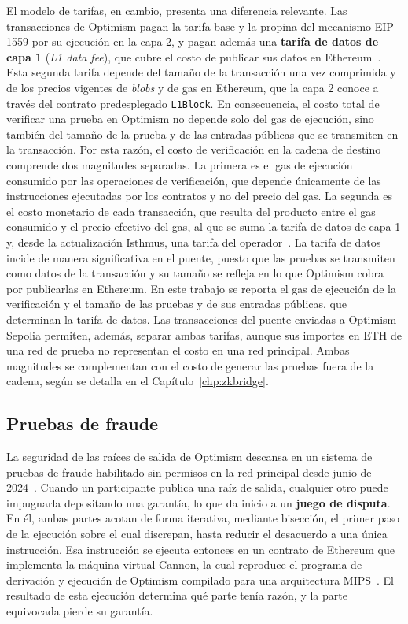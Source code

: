 El modelo de tarifas, en cambio, presenta una diferencia relevante. Las transacciones de Optimism
pagan la tarifa base y la propina del mecanismo EIP-1559 por su ejecución en la capa 2, y pagan
además una \textbf{tarifa de datos de capa 1} (\textit{L1 data fee}), que cubre el costo de
publicar sus datos en Ethereum~\cite{opspecsexec}. Esta segunda tarifa depende del tamaño de la
transacción una vez comprimida y de los precios vigentes de \textit{blobs} y de gas en Ethereum,
que la capa 2 conoce a través del contrato predesplegado \texttt{L1Block}. En consecuencia, el
costo total de verificar una prueba en Optimism no depende solo del gas de ejecución, sino
también del tamaño de la prueba y de las entradas públicas que se transmiten en la transacción.
Por esta razón, el costo de verificación en la cadena de destino comprende dos magnitudes
separadas. La primera es el gas de ejecución consumido por las operaciones de verificación, que
depende únicamente de las instrucciones ejecutadas por los contratos y no del precio del gas. La
segunda es el costo monetario de cada transacción, que resulta del producto entre el gas consumido
y el precio efectivo del gas, al que se suma la tarifa de datos de capa 1 y, desde la actualización
Isthmus, una tarifa del operador~\cite{opfees}. La tarifa de datos incide de manera significativa
en el puente, puesto que las pruebas se transmiten como datos de la transacción y su tamaño se
refleja en lo que Optimism cobra por publicarlas en Ethereum. En este trabajo se reporta el gas de
ejecución de la verificación y el tamaño de las pruebas y de sus entradas públicas, que determinan
la tarifa de datos. Las transacciones del puente enviadas a Optimism Sepolia permiten, además,
separar ambas tarifas, aunque sus importes en ETH de una red de prueba no representan el costo
en una red principal. Ambas magnitudes se complementan con el costo de generar las pruebas fuera de la
cadena, según se detalla en el Capítulo~\ref{chp:zkbridge}.

\subsection{Pruebas de fraude}
\label{sec:op_fraude}

La seguridad de las raíces de salida de Optimism descansa en un sistema de pruebas de fraude
habilitado sin permisos en la red principal desde junio de 2024~\cite{optimismfaultproofs}.
Cuando un participante publica una raíz de salida, cualquier otro puede impugnarla depositando
una garantía, lo que da inicio a un \textbf{juego de disputa}. En él, ambas partes acotan de
forma iterativa, mediante bisección, el primer paso de la ejecución sobre el cual discrepan, hasta
reducir el desacuerdo a una única instrucción. Esa instrucción se ejecuta entonces en un contrato
de Ethereum que implementa la máquina virtual Cannon, la cual reproduce el programa de derivación
y ejecución de Optimism compilado para una arquitectura MIPS~\cite{opcannon}. El resultado de esta
ejecución determina qué parte tenía razón, y la parte equivocada pierde su garantía.

